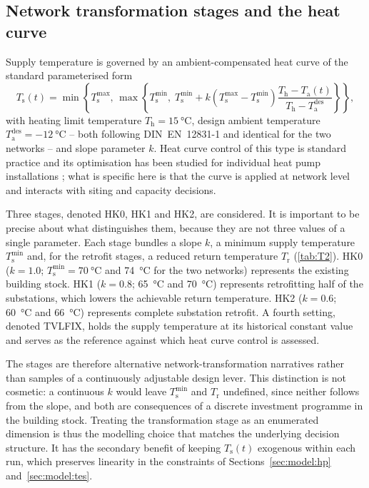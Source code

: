 \documentclass[review,3p]{elsarticle}
\newcommand{\kHC}{k}                      %
\begin{document}
\subsection{Network transformation stages and the heat curve}
\label{sec:model:heatcurve}

Supply temperature is governed by an ambient-compensated heat curve of
the standard parameterised form
\begin{equation}
\label{eq:heatcurve}
T_{\mathrm{s}}(t) = \min\!\left\{ T_{\mathrm{s}}^{\max},\,
\max\!\left\{ T_{\mathrm{s}}^{\min},\;
T_{\mathrm{s}}^{\min} + \kHC \left(T_{\mathrm{s}}^{\max} - T_{\mathrm{s}}^{\min}\right)
\frac{T_{\mathrm{h}} - T_{\mathrm{a}}(t)}{T_{\mathrm{h}} - T_{\mathrm{a}}^{\mathrm{des}}}
\right\} \right\},
\end{equation}
with heating limit temperature $T_{\mathrm{h}} = \SI{15}{\celsius}$,
design ambient temperature $T_{\mathrm{a}}^{\mathrm{des}} =
\SI{-12}{\celsius}$ -- both following DIN~EN~12831-1
\cite{DINEN12831.2017} and identical for the
two networks -- and slope parameter $\kHC$. Heat curve control of this type is standard practice and its
optimisation has been studied for individual heat pump installations
\cite{Krug.2025}; what is specific here is that the curve is applied at
network level and interacts with siting and capacity decisions.

Three stages, denoted HK0, HK1 and HK2, are considered. It is important
to be precise about what distinguishes them, because they are not three
values of a single parameter. Each stage bundles a slope $\kHC$, a
minimum supply temperature $T_{\mathrm{s}}^{\min}$ and, for the retrofit
stages, a reduced return temperature $T_{\mathrm{r}}$
(\cref{tab:T2}). HK0 ($\kHC = 1.0$; $T_{\mathrm{s}}^{\min} =
\SI{70}{\celsius}$ and \SI{74}{\celsius} for the two networks)
represents the existing building stock. HK1 ($\kHC = 0.8$;
\SI{65}{\celsius} and \SI{70}{\celsius}) represents retrofitting half of
the substations, which lowers the achievable return temperature. HK2
($\kHC = 0.6$; \SI{60}{\celsius} and \SI{66}{\celsius}) represents
complete substation retrofit. A fourth setting, denoted TVLFIX, holds
the supply temperature at its historical constant value and serves as
the reference against which heat curve control is assessed.

The stages are therefore alternative network-transformation narratives
rather than samples of a continuously adjustable design lever. This
distinction is not cosmetic: a continuous $\kHC$ would leave
$T_{\mathrm{s}}^{\min}$ and $T_{\mathrm{r}}$ undefined, since neither
follows from the slope, and both are consequences of a discrete
investment programme in the building stock. Treating the transformation
stage as an enumerated dimension is thus the modelling choice that
matches the underlying decision structure. It has the secondary benefit
of keeping $T_{\mathrm{s}}(t)$ exogenous within each run, which
preserves linearity in the constraints of
Sections~\ref{sec:model:hp} and~\ref{sec:model:tes}.
\end{document}
